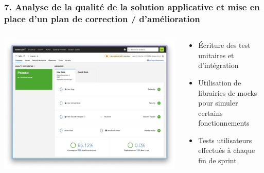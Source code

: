 \documentclass[aspectratio=169]{beamer}
\begin{document}
\begin{frame}
  \frametitle{7. Analyse de la qualité de la solution applicative et mise en place d’un plan de correction / d’amélioration}
  \begin{columns}
    \begin{column}{0.5\textwidth}
      \includegraphics[height=0.70\textheight, center]{Imgs/felix-sonar.png}
    \end{column}
    \begin{column}{0.5\textwidth}
      \begin{itemize}
        \item Écriture des test unitaires et d'intégration
        \item Utilisation de librairies de mocks pour simuler certains fonctionnements
        \item Tests utilisateurs effectués à chaque fin de sprint
      \end{itemize}
    \end{column}
  \end{columns}
\end{frame}
\end{document}
